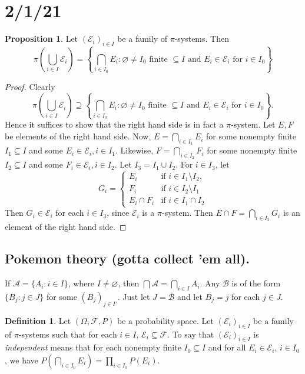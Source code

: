 \documentclass{article}
\newcommand{\F}{\mathscr{F}}
\theoremstyle{definition}
\newtheorem{proposition}[theorem]{Proposition}
\newtheorem*{definition}{Definition}
\begin{document}
\section*{2/1/21}

\begin{proposition}
    Let $(\mathscr{E}_i)_{i \in I}$ be a family of $\pi$-systems. Then $$\pi\left(\bigcup_{i \in I} \mathscr{E}_i\right) = \left\{\bigcap_{i \in I_0} E_i : \varnothing \neq I_0 \text{ finite } \subseteq I \text{ and } E_i \in \mathscr{E}_i \text{ for } i \in I_0\right\}$$
\end{proposition}

\begin{proof}
    Clearly
    $$\pi\left(\bigcup_{i \in I} \mathscr{E}_i\right) \supseteq \left\{\bigcap_{i \in I_0} E_i : \varnothing \neq I_0 \text{ finite } \subseteq I \text{ and } E_i \in \mathscr{E}_i \text{ for } i \in I_0\right\}.$$
    Hence it suffices to show that the right hand side is in fact a $\pi$-system.
    Let $E, F$ be elements of the right hand side. Now, $E = \bigcap_{i \in I_1} E_i$ for some nonempty finite $I_1 \subseteq I$ and some $E_i \in \mathscr{E}_i, i \in I_1$.
    Likewise, $F = \bigcap_{i \in I_2} F_i$ for some nonempty finite $I_2 \subseteq I$ and some $F_i \in \mathscr{E}_i, i \in I_2$.
    Let $I_3 = I_1 \cup I_2$. For $i \in I_3$, let
    $$G_i = 
    \begin{cases}
        E_i &\text{if } i \in I_1 \setminus I_2, \\
        F_i &\text{if } i \in I_2 \setminus I_1 \\
        E_i \cap F_i &\text{if } i \in I_1 \cap I_2
    \end{cases}$$
    Then $G_i \in \mathscr{E}_i$ for each $i \in I_3$, since $\mathscr{E}_i$ is a $\pi$-system.
    Then $E \cap F = \bigcap_{i \in I_3} G_i$ is an element of the right hand side.
\end{proof}

\subsection*{Pokemon theory (gotta collect 'em all).}
If $\mathscr{A} = \{ A_i : i \in I\}$, where $I \neq \varnothing$, then $\bigcap \mathscr{A} = \bigcap_{i \in I} A_i$. Any $\mathscr{B}$ is of the form $\{B_j : j \in J\}$ for some $(B_j)_{j \in I'}$. Just let $J = \mathscr{B}$ and let $B_j = j$ for each $j \in J$.

\begin{definition}
Let $(\Omega, \F, P)$ be a probability space.
Let $(\mathscr{E}_i)_{i \in I}$ be a family of $\pi$-systems such that for each $i \in I$, $\mathscr{E}_i \subseteq \F$. To say that $(\mathscr{E}_i)_{i \in I}$ is \emph{independent} means that for each nonempty finite $I_0 \subseteq I$ and for all $E_i \in \mathscr{E}_i$, $i \in I_0$, we have $P(\bigcap_{i \in I_0} E_i) = \prod_{i \in I_0} P(E_i)$.
\end{definition}
\end{document}
